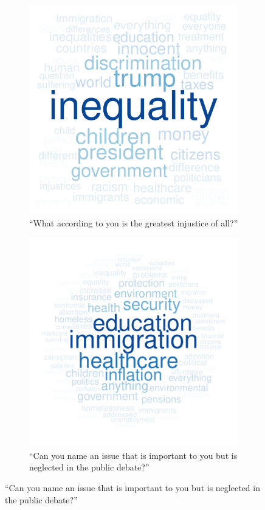 \documentclass[12pt,english]{article}
\begin{document}
\begin{bibunit}
\begin{figure}[h!]
\begin{subfigure}{.49\textwidth}
  \end{subfigure}
  \begin{subfigure}{.49\textwidth}
    \caption[]{``What according to you is the greatest injustice of all?''}
    \includegraphics[width=\textwidth]{../figures/all/injustice_field_en.pdf}
  \end{subfigure} 
  \begin{subfigure}{.49\textwidth}
    \caption[]{``Can you name an issue that is important to you but is neglected in the public debate?''}
    \includegraphics[width=\textwidth]{../figures/all/issue_field_en.pdf}
  \end{subfigure} 
\end{figure}


\end{bibunit}
\end{document}
